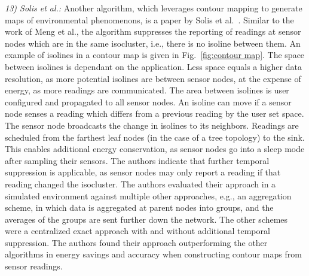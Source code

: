 \textit{13) Solis et al.:}
Another algorithm, which leverages contour mapping to generate maps of
environmental phenomenons, is a paper by Solis et
al.~\cite{solis2005efficient}. Similar to the work of Meng et al., the
algorithm suppresses the reporting of readings at sensor nodes which are in the
same isocluster, i.e., there is no isoline between them. An example of isolines
in a contour map is given in Fig.~\ref{fig:contour map}. The space between
isolines is dependant on the application. Less space equals a higher data
resolution, as more potential isolines are between sensor nodes, at the expense
of energy, as more readings are communicated. The area between isolines is user
configured and propagated to all sensor nodes. An isoline can move if a sensor
node senses a reading which differs from a previous reading by the user set
space. The sensor node broadcasts the change in isolines to its neighbors.
Readings are scheduled from the farthest leaf nodes (in the case of a tree
topology) to the sink. This enables additional energy conservation, as sensor
nodes go into a sleep mode after sampling their sensors. The authors indicate
that further temporal suppression is applicable, as sensor nodes may only
report a reading if that reading changed the isocluster. The authors evaluated
their approach in a simulated environment against multiple other approaches,
e.g., an aggregation scheme, in which data is aggregated at parent nodes into
groups, and the averages of the groups are sent further down the network. The
other schemes were a centralized exact approach with and without additional
temporal suppression. The authors found their approach outperforming the other
algorithms in energy savings and accuracy when constructing contour maps from
sensor readings.

